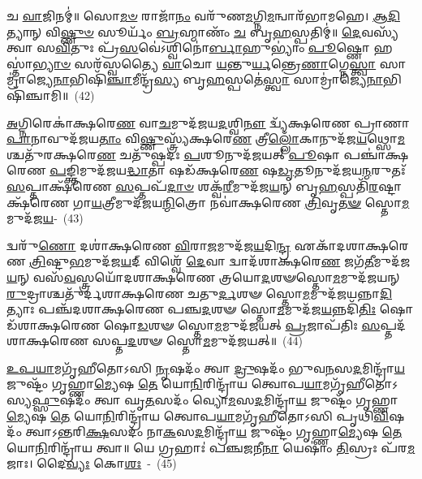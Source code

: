 𑌚 \ul{𑌵𑌾}\-𑌜𑌿𑌨𑌮𑍍॑॥ 𑌸𑍋\-\ul{𑌮}\-\-\ul{𑍞} 𑌰𑌾𑌜𑌾᳴\-\ul{𑌨𑌂} 𑌵𑌰𑍁᳴𑌣\-\ul{𑌮}\-𑌗𑍍𑌨𑌿\-\ul{𑌮}\-𑌨𑍍𑌵𑌾𑌰᳴𑌭𑌾𑌮𑌹𑍇। \ul{𑌆}\-\-\ul{𑌦𑌿}\-𑌤𑍍𑌯𑌾𑌨𑍍 𑌵𑌿\-\ul{𑌷𑍍𑌣𑍁}\-\-\ul{𑍞} 𑌸𑍂𑌰𑍍𑌯𑌂᳴ \ul{𑌬𑍍𑌰}\-𑌹𑍍𑌮𑌾𑌣𑌂᳴ \ul{𑌚} 𑌬𑍃\-\ul{𑌹}\-𑌸𑍍𑌪𑌤𑌿𑌮𑍍॑॥ \ul{𑌦𑍇}\-𑌵𑌸𑍍𑌯᳴ 𑌤𑍍𑌵𑌾 𑌸\-\ul{𑌵𑌿}\-𑌤𑍁𑌃 𑌪𑍍𑌰᳴\-\ul{𑌸}\-𑌵𑍇॑\-𑌽𑌶𑍍𑌵𑌿𑌨𑍋॑\-\ul{𑌰𑍍𑌬𑌾}\-𑌹𑍁\-𑌭𑍍𑌯𑌾𑌂॑ \ul{𑌪𑍂}\-𑌷𑍍𑌣𑍋 𑌹𑌸𑍍𑌤𑌾॑\-\ul{𑌭𑍍𑌯𑌾}\-\-\ul{𑍞} 𑌸𑌰᳴𑌸𑍍𑌵𑌤𑍍𑌯𑍈 \ul{𑌵𑌾}\-𑌚𑍋 \ul{𑌯}\-𑌨𑍍𑌤𑍁\-\ul{𑌰𑍍𑌯}\-𑌨𑍍𑌤𑍍𑌰𑍇\-\ul{𑌣𑌾}\-𑌗𑍍𑌨𑍇\-\ul{𑌸𑍍𑌤𑍍𑌵𑌾} 𑌸𑌾𑌮𑍍𑌰𑌾॑𑌜𑍍𑌯𑍇\-\ul{𑌨𑌾}\-𑌭𑌿𑌷𑌿᳴\-\ul{𑌞𑍍𑌚𑌾}\-𑌮𑍀𑌨𑍍𑌦𑍍𑌰᳴\-\ul{𑌸𑍍𑌯} 𑌬𑍃\-\ul{𑌹}\-𑌸𑍍𑌪𑌤𑍇॑\-\ul{𑌸𑍍𑌤𑍍𑌵𑌾} 𑌸𑌾𑌮𑍍𑌰𑌾॑𑌜𑍍𑌯𑍇\-\ul{𑌨𑌾}\-𑌭𑌿𑌷𑌿᳴𑌞𑍍𑌚𑌾𑌮𑌿॥~(42)

{\anuvakamend[{\-\ul{𑌰}\-𑌯𑌿𑍞 𑌸᳴\-\ul{𑌵𑌿}\-𑌤𑌾\-\ul{𑌰}\-\-\ul{𑍞} 𑌷𑌟𑍍𑌤𑍍𑌰𑌿𑍞᳴𑌶𑌚𑍍𑌚}]}%

\-\ul{𑌅}\-𑌗𑍍𑌨𑌿𑌰𑍇𑌕𑌾॑𑌕𑍍𑌷𑌰𑍇\-\ul{𑌣} 𑌵𑌾\-\ul{𑌚}\-𑌮𑍁𑌦᳴𑌜𑌯\-\ul{𑌦}\-𑌶𑍍𑌵𑌿\-\ul{𑌨𑍗} 𑌦𑍍𑌵𑍍𑌯᳴𑌕𑍍𑌷𑌰𑍇𑌣 𑌪𑍍𑌰𑌾𑌣𑌾\-\-\ul{𑌪𑌾}\-𑌨𑌾\-𑌵𑍁𑌦᳴\-𑌜𑌯\-\ul{𑌤𑌾𑌂} 𑌵𑌿\-\ul{𑌷𑍍𑌣𑍁}\-𑌸𑍍𑌤𑍍𑌰𑍍𑌯᳴𑌕𑍍𑌷𑌰𑍇\-\ul{𑌣} 𑌤𑍍𑌰𑍀\-\ul{𑌲𑍍𑌲𑍋𑌁}\-𑌕𑌾𑌨𑍁𑌦᳴𑌜\-\ul{𑌯}\-𑌥𑍍𑌸𑍋\-\ul{𑌮}\-𑌶𑍍𑌚𑌤𑍁᳴𑌰𑌕𑍍𑌷𑌰𑍇\-\ul{𑌣} 𑌚𑌤𑍁᳴𑌷𑍍𑌪𑌦𑌃 \ul{𑌪}\-𑌶𑍂𑌨𑍁𑌦᳴𑌜𑌯𑌤𑍍 \ul{𑌪𑍂}\-𑌷𑌾 𑌪𑌞𑍍𑌚𑌾॑𑌕𑍍𑌷𑌰𑍇𑌣 \ul{𑌪}\-𑌙𑍍𑌕𑍍𑌤𑌿𑌮𑍁𑌦᳴𑌜𑌯\-\ul{𑌦𑍍𑌧𑌾}\-𑌤𑌾 𑌷𑌡᳴𑌕𑍍𑌷𑌰𑍇\-\ul{𑌣} 𑌷\-\ul{𑌡𑍃}\-𑌤𑍂𑌨𑍁𑌦᳴𑌜𑌯\-\ul{𑌨𑍍𑌮}\-𑌰𑍁𑌤𑌃᳴ \ul{𑌸}\-𑌪𑍍𑌤𑌾𑌕𑍍𑌷᳴𑌰𑍇𑌣 \ul{𑌸}\-𑌪𑍍𑌤𑌪᳴\-\ul{𑌦𑌾}\-\-\ul{𑍞} 𑌶𑌕𑍍𑌵᳴\-\ul{𑌰𑍀}\-𑌮𑍁𑌦᳴𑌜\-\ul{𑌯}\-𑌨𑍍 𑌬𑍃\-\ul{𑌹}\-𑌸𑍍𑌪𑌤𑌿᳴\-\ul{𑌰}\-𑌷𑍍𑌟𑌾𑌕𑍍𑌷᳴𑌰𑍇𑌣 𑌗𑌾\-\ul{𑌯}\-𑌤𑍍𑌰𑍀𑌮𑍁𑌦᳴𑌜𑌯\-\ul{𑌨𑍍𑌮𑌿}\-𑌤𑍍𑌰𑍋 𑌨𑌵𑌾॑𑌕𑍍𑌷𑌰𑍇𑌣 \ul{𑌤𑍍𑌰𑌿}\-𑌵𑍃\-\ul{𑌤}\-\-\ul{𑍟} 𑌸𑍍𑌤𑍋\-\ul{𑌮}\-𑌮𑍁𑌦᳴𑌜\-\ul{𑌯}\--~(43)

𑌦𑍍𑌵𑌰𑍁᳴\-\ul{𑌣𑍋} 𑌦𑌶𑌾॑𑌕𑍍𑌷𑌰𑍇𑌣 \ul{𑌵𑌿}\-𑌰𑌾\-\ul{𑌜}\-𑌮𑍁𑌦᳴𑌜\-\ul{𑌯}\-𑌦𑌿\-\ul{𑌨𑍍𑌦𑍍𑌰} 𑌏𑌕𑌾᳴\-𑌦𑌶𑌾\-𑌕𑍍𑌷𑌰𑍇𑌣 \ul{𑌤𑍍𑌰𑌿}\-𑌷𑍍𑌟𑍁\-\ul{𑌭}\-𑌮𑍁𑌦᳴𑌜\-\ul{𑌯}\-𑌦𑍍 𑌵𑌿𑌶𑍍𑌵𑍇᳴ \ul{𑌦𑍇}\-𑌵𑌾 𑌦𑍍𑌵𑌾𑌦᳴𑌶𑌾𑌕𑍍𑌷𑌰𑍇\-\ul{𑌣} 𑌜𑌗᳴\-\ul{𑌤𑍀}\-𑌮𑍁𑌦᳴𑌜\-\ul{𑌯}\-𑌨𑍍 𑌵𑌸᳴\-\ul{𑌵}\-𑌸𑍍𑌤𑍍𑌰𑌯𑍋᳴\-𑌦𑌶𑌾\-𑌕𑍍𑌷𑌰𑍇𑌣 𑌤𑍍𑌰𑌯𑍋\-\ul{𑌦}\-𑌶𑍟𑌸𑍍𑌤𑍋\-\ul{𑌮}\-𑌮𑍁𑌦᳴𑌜𑌯𑌨𑍍 \ul{𑌰𑍁}\-𑌦𑍍𑌰𑌾𑌶𑍍𑌚𑌤𑍁᳴𑌰𑍍𑌦𑌶𑌾\-𑌕𑍍𑌷𑌰𑍇𑌣 𑌚𑌤𑍁\-\ul{𑌰𑍍𑌦}\-𑌶𑍟 𑌸𑍍𑌤𑍋\-\ul{𑌮}\-𑌮𑍁𑌦᳴𑌜𑌯𑌨𑍍𑌨𑌾\-\ul{𑌦𑌿}\-𑌤𑍍𑌯𑌾𑌃 𑌪𑌞𑍍𑌚᳴\-𑌦𑌶𑌾\-𑌕𑍍𑌷𑌰𑍇𑌣 𑌪𑌞𑍍𑌚\-\ul{𑌦}\-𑌶𑍟 𑌸𑍍𑌤𑍋\-\ul{𑌮}\-𑌮𑍁𑌦᳴𑌜\-\ul{𑌯}\-𑌨𑍍𑌨𑌦𑌿᳴\-\ul{𑌤𑌿𑌃} 𑌷𑍋𑌡᳴𑌶𑌾𑌕𑍍𑌷𑌰𑍇𑌣 𑌷𑍋\-\ul{𑌡}\-𑌶𑍟 𑌸𑍍𑌤𑍋\-\ul{𑌮}\-𑌮𑍁𑌦᳴𑌜𑌯𑌤𑍍 \ul{𑌪𑍍𑌰}\-𑌜𑌾𑌪᳴𑌤𑌿𑌃 \ul{𑌸}\-𑌪𑍍𑌤𑌦᳴𑌶𑌾𑌕𑍍𑌷𑌰𑍇𑌣 𑌸𑌪𑍍𑌤\-\ul{𑌦}\-𑌶𑍟 𑌸𑍍𑌤𑍋\-\ul{𑌮}\-𑌮𑍁𑌦᳴𑌜𑌯𑌤𑍍॥~(44)

{\anuvakamend[{\-\ul{𑌅}\-\-\ul{𑌜}\-\-\ul{𑌯}\-𑌤𑍍 𑌷𑌟𑍍𑌚᳴𑌤𑍍𑌵𑌾𑌰𑌿𑍞𑌶𑌚𑍍𑌚}]}%

\-\ul{𑌉}\-\-\ul{𑌪}\-\-\ul{𑌯𑌾}\-𑌮𑌗𑍃᳴𑌹𑍀𑌤𑍋\-𑌽𑌸𑌿 \ul{𑌨𑍃}\-𑌷𑌦𑌂᳴ 𑌤𑍍𑌵𑌾 \ul{𑌦𑍍𑌰𑍁}\-𑌷𑌦𑌂᳴ 𑌭𑍁𑌵\-\ul{𑌨}\-𑌸\-\ul{𑌦}\-𑌮𑌿𑌨𑍍𑌦𑍍𑌰𑌾᳴\-\ul{𑌯} 𑌜𑍁𑌷𑍍𑌟𑌂᳴ 𑌗𑍃𑌹𑍍𑌣𑌾\-\ul{𑌮𑍍𑌯𑍇}\-𑌷 \ul{𑌤𑍇} 𑌯𑍋\-\ul{𑌨𑌿}\-𑌰𑌿𑌨𑍍𑌦𑍍𑌰𑌾᳴𑌯 𑌤𑍍𑌵𑍋𑌪\-\ul{𑌯𑌾}\-𑌮𑌗𑍃᳴𑌹𑍀𑌤𑍋\-𑌽𑌸𑍍𑌯\-\ul{𑌫𑍍𑌸𑍁}\-𑌷𑌦𑌂᳴ 𑌤𑍍𑌵𑌾 𑌘𑍃\-\ul{𑌤}\-𑌸𑌦𑌂᳴ 𑌵𑍍𑌯𑍋\-\ul{𑌮}\-𑌸\-\ul{𑌦}\-𑌮𑌿𑌨𑍍𑌦𑍍𑌰𑌾᳴\-\ul{𑌯} 𑌜𑍁𑌷𑍍𑌟𑌂᳴ 𑌗𑍃𑌹𑍍𑌣𑌾\-\ul{𑌮𑍍𑌯𑍇}\-𑌷 \ul{𑌤𑍇} 𑌯𑍋\-\ul{𑌨𑌿}\-𑌰𑌿𑌨𑍍𑌦𑍍𑌰𑌾᳴𑌯 𑌤𑍍𑌵𑍋𑌪\-\ul{𑌯𑌾}\-𑌮𑌗𑍃᳴𑌹𑍀𑌤𑍋\-𑌽𑌸𑌿 𑌪𑍃𑌥𑌿\-\ul{𑌵𑌿}\-𑌷𑌦𑌂᳴ 𑌤𑍍𑌵𑌾\-𑌽𑌨𑍍𑌤𑌰𑌿\-\ul{𑌕𑍍𑌷}\-𑌸𑌦𑌂᳴ 𑌨𑌾\-\ul{𑌕}\-𑌸\-\ul{𑌦}\-𑌮𑌿𑌨𑍍𑌦𑍍𑌰𑌾᳴\-\ul{𑌯} 𑌜𑍁𑌷𑍍𑌟𑌂᳴ 𑌗𑍃𑌹𑍍𑌣𑌾\-\ul{𑌮𑍍𑌯𑍇}\-𑌷 \ul{𑌤𑍇} 𑌯𑍋\-\ul{𑌨𑌿}\-𑌰𑌿𑌨𑍍𑌦𑍍𑌰𑌾᳴𑌯 𑌤𑍍𑌵𑌾॥ 𑌯𑍇 𑌗𑍍𑌰𑌹𑌾𑌃॑ 𑌪𑌞𑍍𑌚\-\ul{𑌜}\-𑌨𑍀\-\ul{𑌨𑌾} 𑌯𑍇𑌷𑌾𑌂॑ \ul{𑌤𑌿}\-𑌸𑍍𑌰𑌃 𑌪᳴𑌰\-\ul{𑌮}\-𑌜𑌾𑌃। 𑌦𑍈\-\ul{𑌵𑍍𑌯𑌃} 𑌕𑍋\-\ul{𑌶𑌃}\-~-~(45)

